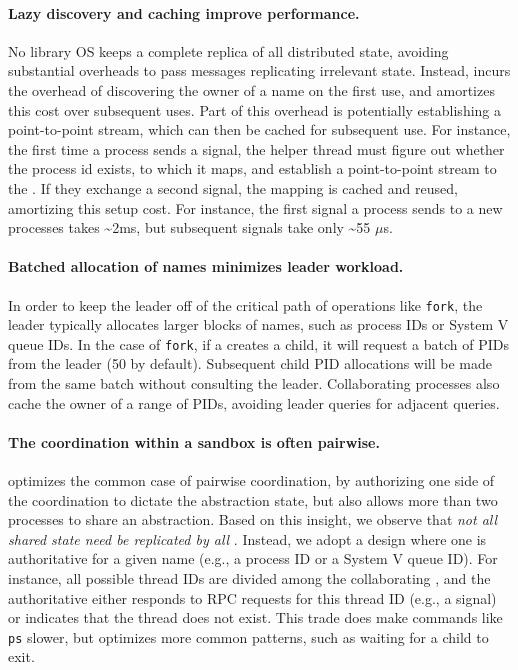 \paragraph{Lazy discovery and caching improve performance.}  
No library OS keeps a complete replica of all distributed state,
avoiding substantial overheads to pass messages replicating irrelevant state.
Instead, \sysname{} incurs the overhead of discovering the owner of a name
on the first use, and amortizes this cost over subsequent uses.
Part of this overhead is potentially establishing a point-to-point stream,
which can then be cached for subsequent use.
For instance, the first time a process sends a signal, the helper thread 
must figure out whether the process id exists, to which \picoproc{} it maps,
and establish a point-to-point stream to the \picoproc{}.
If they exchange a second signal, the mapping is cached and reused, amortizing this 
setup cost.  For instance, the first signal a process sends to a new processes
takes \~{}2ms, but subsequent signals take only \~{}55 $\mu$s.

\paragraph{Batched allocation of names minimizes leader workload.}
In order to keep the leader off of the critical path of operations like {\tt fork}, 
the leader typically allocates larger blocks of names, such as process IDs or System V queue IDs.
In the case of {\tt fork}, if a \picoproc{} creates a child, it will request a batch of 
PIDs from the leader (50 by default).  Subsequent child PID allocations will be made from the same 
batch without consulting the leader.
Collaborating processes also cache the owner of a range of PIDs, avoiding 
leader queries for adjacent queries.

\paragraph{The coordination within a sandbox is often pairwise.}
\sysname{} optimizes the common case of pairwise coordination,
by authorizing one side of the coordination to dictate the abstraction state,
but also allows
more than two processes to share an abstraction.
Based on this insight, 
we observe that {\em not all shared state need be replicated by all \picoprocs{}}.
Instead, we adopt a design where one \picoproc{} is authoritative for a given name (e.g., a process ID or a System V queue ID).
For instance, all possible thread IDs are divided among the collaborating \picoprocs{},
and the authoritative \picoproc{} either responds to RPC requests for this thread ID (e.g., a signal)
or indicates that the thread does not exist.
This trade does make commands like {\tt ps} slower, 
but optimizes more common patterns, such as waiting for a child to exit.


